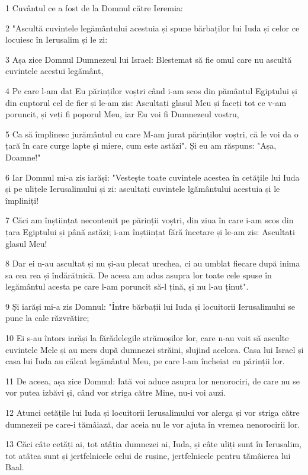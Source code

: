 \par 1 Cuvântul ce a fost de la Domnul către Ieremia:
\par 2 "Ascultă cuvintele legământului acestuia și spune bărbaților lui Iuda și celor ce locuiesc în Ierusalim și le zi:
\par 3 Așa zice Domnul Dumnezeul lui Israel: Blestemat să fie omul care nu ascultă cuvintele acestui legământ,
\par 4 Pe care l-am dat Eu părinților voștri când i-am scos din pământul Egiptului și din cuptorul cel de fier și le-am zis: Ascultați glasul Meu și faceți tot ce v-am poruncit, și veți fi poporul Meu, iar Eu voi fi Dumnezeul vostru,
\par 5 Ca să împlinesc jurământul cu care M-am jurat părinților voștri, că le voi da o țară în care curge lapte și miere, cum este astăzi". Și eu am răspuns: "Așa, Doamne!"
\par 6 Iar Domnul mi-a zis iarăși: "Vestește toate cuvintele acestea în cetățile lui Iuda și pe ulițele Ierusalimului și zi: ascultați cuvintele lgământului acestuia și le împliniți!
\par 7 Căci am înștiințat necontenit pe părinții voștri, din ziua în care i-am scos din țara Egiptului și până astăzi; i-am înștiințat fără încetare și le-am zis: Ascultați glasul Meu!
\par 8 Dar ei n-au ascultat și nu și-au plecat urechea, ci au umblat fiecare după inima sa cea rea și îndărătnică. De aceea am adus asupra lor toate cele spuse în legământul acesta pe care l-am poruncit să-l țină, și nu l-au ținut".
\par 9 Și iarăși mi-a zis Domnul: "Între bărbații lui Iuda și locuitorii Ierusalimului se pune la cale răzvrătire;
\par 10 Ei s-au întors iarăși la fărădelegile strămoșilor lor, care n-au voit să asculte cuvintele Mele și au mers după dumnezei străini, slujind acelora. Casa lui Israel și casa lui Iuda au călcat legământul Meu, pe care l-am încheiat cu părinții lor.
\par 11 De aceea, așa zice Domnul: Iată voi aduce asupra lor nenorociri, de care nu se vor putea izbăvi și, când vor striga către Mine, nu-i voi auzi.
\par 12 Atunci cetățile lui Iuda și locuitorii Ierusalimului vor alerga și vor striga către dumnezeii pe care-i tămâiază, dar aceia nu le vor ajuta în vremea nenorocirii lor.
\par 13 Căci câte cetăți ai, tot atâția dumnezei ai, Iuda, și câte uliți sunt în Ierusalim, tot atâtea sunt și jertfelnicele celui de rușine, jertfelnicele pentru tămâierea lui Baal.
